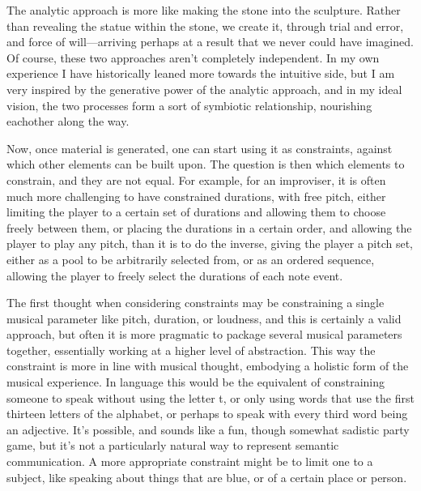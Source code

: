\documentclass[12pt,twoside,maitrise]{dms}
\theoremstyle{definition}
\begin{document}
The analytic approach is more like making the stone into the sculpture.
Rather than revealing the statue within the stone, we create it, through trial and error, and force of will—arriving perhaps at a result that we never could have imagined.
Of course, these two approaches aren’t completely independent.
In my own experience I have historically leaned more towards the intuitive side, but I am very inspired by the generative power of the analytic approach, and in my ideal vision, the two processes form a sort of symbiotic relationship, nourishing eachother along the way.


Now, once material is generated, one can start using it as constraints, against which other elements can be built upon.
The question is then which elements to constrain, and they are not equal.
For example, for an improviser, it is often much more challenging to have constrained durations, with free pitch, either limiting the player to a certain set of durations and allowing them to choose freely between them, or placing the durations in a certain order, and allowing the player to play any pitch, than it is to do the inverse, giving the player a pitch set, either as a pool to be arbitrarily selected from, or as an ordered sequence, allowing the player to freely select the durations of each note event.

The first thought when considering constraints may be constraining a single musical parameter like pitch, duration, or loudness, and this is certainly a valid approach, but often it is more pragmatic to package several musical parameters together, essentially working at a higher level of abstraction.
This way the constraint is more in line with musical thought, embodying a holistic form of the musical experience.
In language this would be the equivalent of constraining someone to speak without using the letter t, or only using words that use the first thirteen letters of the alphabet, or perhaps to speak with every third word being an adjective.
It’s possible, and sounds like a fun, though somewhat sadistic party game, but it’s not a particularly natural way to represent semantic communication.
A more appropriate constraint might be to limit one to a subject, like speaking about things that are blue, or of a certain place or person.
\end{document}
